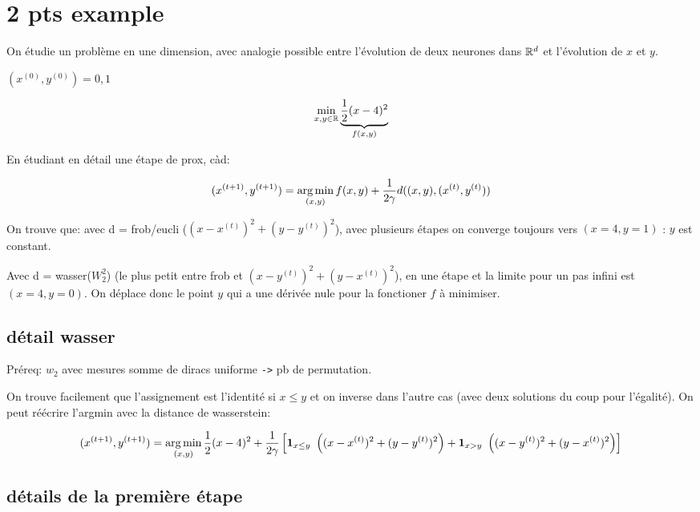 \section{2 pts example}

On étudie un problème en une dimension, avec analogie possible entre l'évolution de deux neurones dans $\mathbb{R}^d$ et l'évolution de $x$ et $y$.

$(x^{(0)}, y^{(0)}) = 0, 1$

\begin{equation}
	\min_{x,y \in \mathbb{R}} \underbrace{\frac{1}{2}(x - 4)^2}_{f(x, y)}
\end{equation}

En étudiant en détail une étape de prox, càd:

\begin{equation}
	(x^{(t+1)}, y^{(t+1)}) = \operatorname*{arg\,min}_{(x, y)} f(x, y) + \frac{1}{2 \gamma} d((x,y),(x^{(t)}, y^{(t)}))
\end{equation}

On trouve que: avec d = frob/eucli ($(x-x^{(t)})^2 + (y-y^{(t)})^2$), avec plusieurs étapes on converge toujours vers $(x=4, y=1)$ : $y$ est constant.

Avec d = wasser($W^2_2$) (le plus petit entre frob et $(x-y^{(t)})^2 + (y-x^{(t)})^2$), en une étape et la limite pour un pas infini est $(x=4, y=0)$. On déplace donc le point $y$ qui a une dérivée nule pour la fonctioner $f$ à minimiser.

\subsection{détail wasser}

Préreq: $w_2$ avec mesures somme de diracs uniforme \verb|->| pb de permutation.

On trouve facilement que l'assignement est l'identité si $x \leq  y$ et on inverse dans l'autre cas (avec deux solutions du coup pour l'égalité). On peut réécrire l'argmin avec la distance de wasserstein:

\begin{equation}
	(x^{(t+1)}, y^{(t+1)}) = \operatorname*{arg\,min}_{(x, y)} \frac{1}{2}(x-4)^2 + \frac{1}{2 \gamma} \left[ \mathbf{1}_{x \leq y} ~ \left((x-x^{(t)})^2 + (y - y^{(t)})^2\right) + \mathbf{1}_{x > y} ~ \left((x-y^{(t)})^2 + (y - x^{(t)})^2\right) \right]
\end{equation}

\subsection{détails de la première étape}

